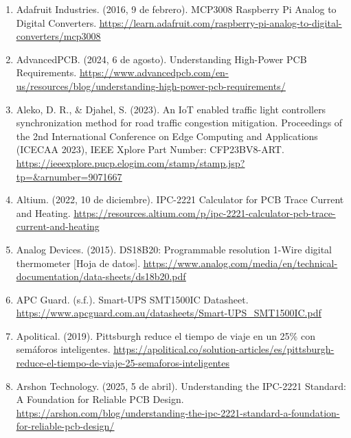 \begin{enumerate}
\def\labelenumi{\arabic{enumi}.}
\item
  Adafruit Industries. (2016, 9 de febrero). MCP3008 \textbar{} Raspberry Pi Analog to Digital Converters. \href{https://learn.adafruit.com/raspberry-pi-analog-to-digital-converters/mcp3008}{\ul{https://learn.adafruit.com/raspberry-pi-analog-to-digital-converters/mcp3008}}
\item
  AdvancedPCB. (2024, 6 de agosto). Understanding High-Power PCB Requirements. \href{https://www.advancedpcb.com/en-us/resources/blog/understanding-high-power-pcb-requirements/}{\ul{https://www.advancedpcb.com/en-us/resources/blog/understanding-high-power-pcb-requirements/}}
\item
  Aleko, D. R., \& Djahel, S. (2023). An IoT enabled traffic light controllers synchronization method for road traffic congestion mitigation. Proceedings of the 2nd International Conference on Edge Computing and Applications (ICECAA 2023), IEEE Xplore Part Number: CFP23BV8-ART. \href{https://ieeexplore.pucp.elogim.com/stamp/stamp.jsp?tp=&arnumber=9071667}{\ul{https://ieeexplore.pucp.elogim.com/stamp/stamp.jsp?tp=\&arnumber=9071667}}
\item
  Altium. (2022, 10 de diciembre). IPC-2221 Calculator for PCB Trace Current and Heating. \href{https://resources.altium.com/p/ipc-2221-calculator-pcb-trace-current-and-heating}{\ul{https://resources.altium.com/p/ipc-2221-calculator-pcb-trace-current-and-heating}}
\item
  Analog Devices. (2015). DS18B20: Programmable resolution 1-Wire digital thermometer {[}Hoja de datos{]}. \href{https://www.analog.com/media/en/technical-documentation/data-sheets/ds18b20.pdf}{\ul{https://www.analog.com/media/en/technical-documentation/data-sheets/ds18b20.pdf}}
\item
  APC Guard. (s.f.). Smart-UPS SMT1500IC Datasheet. \href{https://www.apcguard.com.au/datasheets/Smart-UPS_SMT1500IC.pdf}{\ul{https://www.apcguard.com.au/datasheets/Smart-UPS\_SMT1500IC.pdf}}
\item
  Apolitical. (2019). Pittsburgh reduce el tiempo de viaje en un 25\% con semáforos inteligentes. \href{https://apolitical.co/solution-articles/es/pittsburgh-reduce-el-tiempo-de-viaje-25-semaforos-inteligentes}{\ul{https://apolitical.co/solution-articles/es/pittsburgh-reduce-el-tiempo-de-viaje-25-semaforos-inteligentes}}
\item
  Arshon Technology. (2025, 5 de abril). Understanding the IPC-2221 Standard: A Foundation for Reliable PCB Design. \href{https://arshon.com/blog/understanding-the-ipc-2221-standard-a-foundation-for-reliable-pcb-design/}{\ul{https://arshon.com/blog/understanding-the-ipc-2221-standard-a-foundation-for-reliable-pcb-design/}}

\end{enumerate}
